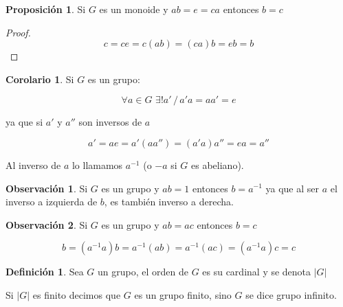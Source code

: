 \documentclass{article}
\theoremstyle{definition}
\newtheorem{defn}{Definici\'on}[subsection]
\newtheorem{prop}{Proposici\'on}[subsection]
\newtheorem{obs}{Observaci\'on}[subsection]
\newtheorem{cor}{Corolario}[subsection]
\begin{document}
\begin{prop}
Si $G$ es un monoide y $ab = e = ca$ entonces $b = c$
\end{prop}

\begin{proof}
$$c = ce = c(ab) = (ca)b = eb = b$$
\end{proof}

\begin{cor}
Si $G$ es un grupo:

$$\forall a \in G \,\, \exists ! a' \,/\, a'a = aa' = e$$

\noindent ya que si $a'$ y $a''$ son inversos de $a$

$$a' = ae = a'(aa'') = (a'a)a'' = ea = a''$$
\end{cor}

Al inverso de $a$ lo llamamos $a^{-1}$ (o $-a$ si $G$ es abeliano).

\begin{obs}
Si $G$ es un grupo y $ab = 1$ entonces $b = a^{-1}$ ya que al ser $a$ el inverso a izquierda de $b$, es tambi\'en inverso a derecha.
\end{obs}

\begin{obs}
Si $G$ es un grupo y $ab = ac$ entonces $b = c$

$$b = (a^{-1}a)b = a^{-1}(ab) = a^{-1}(ac) = (a^{-1}a)c = c$$
\end{obs}

\begin{defn}
Sea $G$ un grupo, el orden de $G$ es su cardinal y se denota $|G|$
\end{defn}

Si $|G|$ es finito decimos que $G$ es un grupo finito, sino $G$ se dice grupo infinito.

\bigskip

\end{document}
